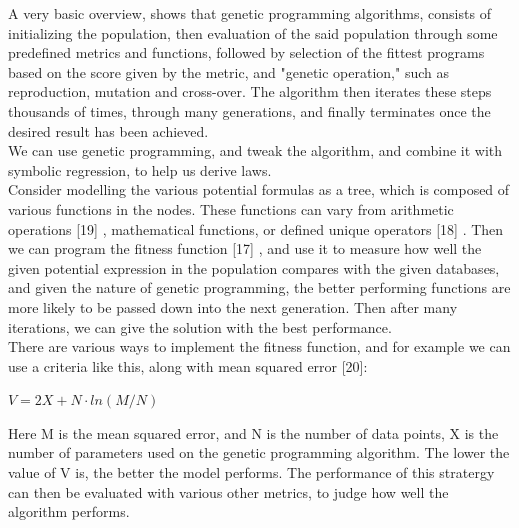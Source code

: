 \documentclass{article}
\begin{document}
A very basic overview, shows that genetic programming algorithms, consists of initializing the population, then evaluation of the said population through some predefined metrics and functions, followed by selection of the fittest programs based on the score given by the metric, and "genetic operation," such as reproduction, mutation and cross-over. The algorithm then iterates these steps thousands of times, through many generations, and finally terminates once the desired result has been achieved.\\

We can use genetic programming, and tweak the algorithm, and combine it with symbolic regression, to help us derive laws. \\

Consider modelling the various potential formulas as a tree, which is composed of various functions in the nodes. These functions can vary from arithmetic operations [19] , mathematical functions, or defined unique operators [18] . Then we can program the fitness function [17] , and use it to measure how well the given potential expression in the population compares with the given databases, and given the nature of genetic programming, the better performing functions are more likely to be passed down into the next generation. Then after many iterations, we can give the solution with the best performance. \\ 

There are various ways to implement the fitness function, and for example we can use a criteria like this, along with mean squared error [20]:\\

\begin{center}
  $V = 2X + N \cdot ln(M/N) $
\end{center}

Here M is the mean squared error, and N is the number of data points, X is the number of parameters used on the genetic programming algorithm. The lower the value of V is, the better the model performs. The performance of this stratergy can then be evaluated with various other metrics, to judge how well the algorithm performs. \\ 










\end{document}

